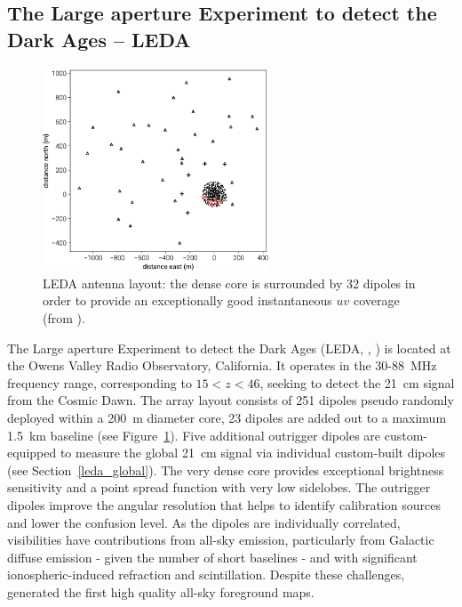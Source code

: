\subsection{The Large aperture Experiment to detect the Dark Ages -- LEDA}
\label{section:leda_pspec}
\begin{figure}[]
\begin{center}
\includegraphics[width=0.6\textwidth]{Koopmans_Bernardi/lwa_layout}
\end{center}
\caption{LEDA antenna layout: the dense core is surrounded by 32 dipoles in order to provide an exceptionally good instantaneous $uv$ coverage (from \cite{eastwood18}).}
\label{fig:fig_leda}
\end{figure}
The Large aperture Experiment to detect the Dark Ages (LEDA, \cite{bernardi15}, \cite{kocz15}) is located at the Owens Valley Radio Observatory, California. It operates in the 30-88~MHz frequency range, corresponding to $15 < z < 46$, seeking to detect the 21~cm signal from the Cosmic Dawn.   
The array layout consists of 251 dipoles pseudo randomly deployed within a 200~m diameter core, 23 dipoles are added out to a maximum 1.5~km baseline (see Figure~\ref{fig:fig_leda}). Five additional outrigger dipoles are custom-equipped to measure the global 21~cm signal via individual custom-built dipoles (see Section~\ref{leda_global}).
%
The very dense core provides exceptional brightness sensitivity and a point spread function with very low sidelobes. The outrigger dipoles improve the angular resolution that helps to identify calibration sources and lower the confusion level. As the dipoles are individually correlated, visibilities have contributions from all-sky emission, particularly from Galactic diffuse emission - given the number of short baselines - and with significant ionospheric-induced refraction and scintillation. Despite these challenges, \cite{eastwood18} generated the first high quality all-sky foreground maps. 
